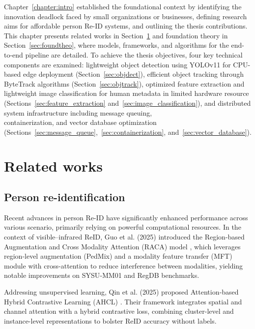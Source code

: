 \documentclass[../main.tex]{subfiles}
\begin{document}
Chapter~\ref{chapter:intro} established the foundational context by identifying the innovation deadlock faced by small organizations or businesses, defining research aims for affordable person Re-ID systems, and outlining the thesis contributions. This chapter presents related works in Section~\ref{sec:related} and foundation theory in Section~\ref{sec:foundtheo}, where models, frameworks, and algorithms for the end-to-end pipeline are detailed. To achieve the thesis objectives, four key technical components are examined: lightweight object detection using YOLOv11 for CPU-based edge deployment (Section~\ref{sec:objdect}), efficient object tracking through ByteTrack algorithms (Section~\ref{sec:objtrack}), optimized feature extraction and lightweight image classification for human metadata in limited hardware resource (Sections~\ref{sec:feature_extraction} and~\ref{sec:image_classification}), and distributed system infrastructure including message queuing,\\ containerization, and vector database optimization (Sections~\ref{sec:message_queue},~\ref{sec:containerization}, and~\ref{sec:vector_database}).

\section{Related works}
\label{sec:related}

\subsection{Person re-identification}
\label{sec:personreid}

Recent advances in person Re-ID have significantly enhanced performance across various scenario, primarily relying on powerful computational resources. In the context of visible–infrared ReID, Guo et al. (2025) introduced the Region‑based Augmentation and Cross Modality Attention (RACA) model \cite{visible-infrared-reid}, which leverages region-level augmentation (PedMix) and a modality feature transfer (MFT) module with cross-attention to reduce interference between modalities, yielding notable improvements on SYSU‑MM01 and RegDB benchmarks.

Addressing unsupervised learning, Qin et al. (2025) proposed Attention‑based Hybrid Contrastive Learning (AHCL) \cite{unsupervised-reid}. Their framework integrates spatial and channel attention with a hybrid contrastive loss, combining cluster-level and instance-level representations to bolster ReID accuracy without labels.
 
\end{document}
